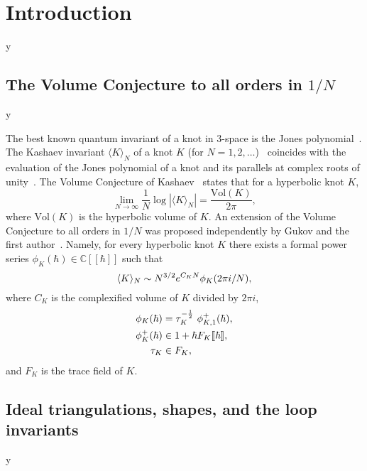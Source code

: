 \documentclass[12pt]{amsart}
\theoremstyle{definition}
\def\printname#1{
        \if\draft y
                \smash{\makebox[0pt]{\hspace{-0.5in}
                        \raisebox{8pt}{\tt\tiny #1}}}
        \fi
}
\def\lbl#1{\label{#1}\printname{#1}}
\def\BC{\mathbb C}
\def\la{\langle}
\def\ra{\rangle}
\def\Vol{\mathrm{Vol}}
\begin{document}
\tableofcontents



\section{Introduction}
\lbl{sec.intro}

\subsection{The Volume Conjecture to all orders in $1/N$}
\lbl{sub.nloop}

The best known quantum invariant of a knot in 3-space is the Jones 
polynomial~\cite{Jones}. The Kashaev invariant $\la K \ra_N$ of a knot
$K$ (for $N=1,2,\dots$)~\cite{Kashaev95} coincides with the evaluation of the 
Jones polynomial of a knot and its parallels at complex roots of 
unity~\cite{MM}. The Volume Conjecture of Kashaev~\cite{Kashaev95} states 
that for a hyperbolic knot $K$, 
$$
\lim_{N \to \infty} \frac{1}{N} \log | \la K \ra_N| = \frac{\Vol(K)}{2\pi},
$$
where $\Vol(K)$ is the hyperbolic volume of $K$. An extension of the 
Volume Conjecture to all orders in $1/N$ was proposed independently by 
Gukov and the first author~\cite{Gu,Ga:arithmetic}. Namely, for every 
hyperbolic knot $K$ there exists a formal power series 
$\phi_K(\hbar) \in \BC[\![\hbar]\!]$ such that
\begin{equation}
\lbl{eq.expN}
\langle K \rangle_N \sim N^{3/2} e^{C_K N} \phi_K(2 \pi i/N),
\end{equation}
where $C_K$ is the complexified volume of $K$ divided by $2 \pi i$,
\begin{subequations}
\begin{align}
\lbl{eq.FK1}
\phi_K(\hbar) &=\tau_K^{-\frac{1}{2}} \,\, \phi^+_{K,1}(\hbar) ,\\
\lbl{eq.FK2}
\phi^+_K(\hbar) & \in 1 + \hbar F_K[\![\hbar]\!] ,\\
\lbl{eq.FK3}
\tau_K & \in F_K,
\end{align}
\end{subequations}
and $F_K$ is the trace field of $K$. 

\subsection{Ideal triangulations, shapes, and the loop invariants}
\lbl{sub.loop}
\end{document}
